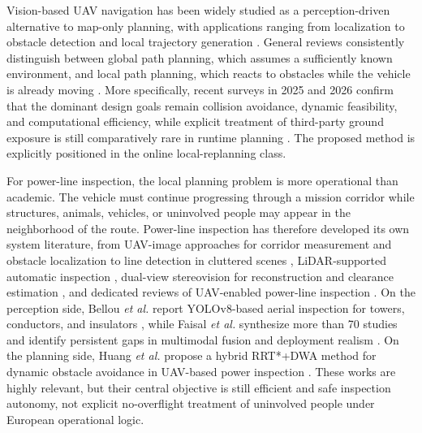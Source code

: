 \documentclass[a4paper,11pt]{article}
\begin{document}
Vision-based UAV navigation has been widely studied as a perception-driven alternative to map-only planning, with applications ranging from localization to obstacle detection and local trajectory generation \cite{arafat2023vision,huang2025investigation}. General reviews consistently distinguish between global path planning, which assumes a sufficiently known environment, and local path planning, which reacts to obstacles while the vehicle is already moving \cite{debnath2024review,meng2025advances}. More specifically, recent surveys in 2025 and 2026 confirm that the dominant design goals remain collision avoidance, dynamic feasibility, and computational efficiency, while explicit treatment of third-party ground exposure is still comparatively rare in runtime planning \cite{merei2025survey,nafees2026review}. The proposed method is explicitly positioned in the online local-replanning class.

For power-line inspection, the local planning problem is more operational than academic. The vehicle must continue progressing through a mission corridor while structures, animals, vehicles, or uninvolved people may appear in the neighborhood of the route. Power-line inspection has therefore developed its own system literature, from UAV-image approaches for corridor measurement and obstacle localization \cite{zhang2017powerline} to line detection in cluttered scenes \cite{zhang2019powerlines}, LiDAR-supported automatic inspection \cite{guan2021uavlidar}, dual-view stereovision for reconstruction and clearance estimation \cite{zhou2022dualview}, and dedicated reviews of UAV-enabled power-line inspection \cite{mendu2025state}. On the perception side, Bellou \emph{et al.} report YOLOv8-based aerial inspection for towers, conductors, and insulators \cite{bellou2024aerial}, while Faisal \emph{et al.} synthesize more than 70 studies and identify persistent gaps in multimodal fusion and deployment realism \cite{faisal2025deep}. On the planning side, Huang \emph{et al.} propose a hybrid RRT*+DWA method for dynamic obstacle avoidance in UAV-based power inspection \cite{huang2025hybrid}. These works are highly relevant, but their central objective is still efficient and safe inspection autonomy, not explicit no-overflight treatment of uninvolved people under European operational logic.
\end{document}

